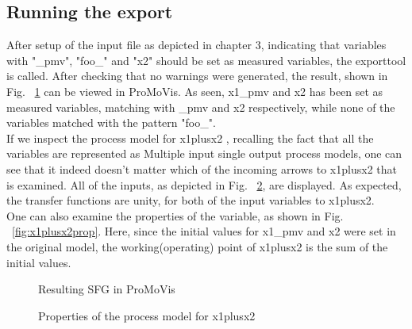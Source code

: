 \subsection{Running the export}
After setup of the input file as depicted in chapter 3, indicating that variables with "\_pmv", "foo\_" and "x2" should be set as measured variables, the exporttool is called. After checking that no warnings were generated, the result, shown in Fig. ~\ref{fig:exsfg} can be viewed in ProMoVis. As seen,  x1\_pmv and x2 has been set as measured variables, matching with \_pmv and x2 respectively, while none of the variables matched with the pattern "foo\_".\\\newline If we inspect the process model for x1plusx2 
, recalling the fact that all the variables are represented as Multiple input single output process models, one can see that it indeed doesn't matter which of the incoming arrows to x1plusx2 that is examined. All of the inputs, as depicted in Fig. ~\ref{fig:x1plusx2}, are displayed. As expected, the transfer functions are unity, for both of the input variables to x1plusx2.\\\newline%
One can also examine the properties of the variable, as shown in Fig. ~\ref{fig:x1plusx2prop}. Here, since the initial values for x1\_pmv and x2 were set in the original model, the working(operating) point of x1plusx2 is the sum of the initial values.%
%
\begin{figure}
\caption{Resulting SFG in ProMoVis}
\label{fig:exsfg}
\end{figure} 
%
%
\begin{figure}
\caption{Properties of the process model for x1plusx2}
\label{fig:x1plusx2}
\end{figure} 
